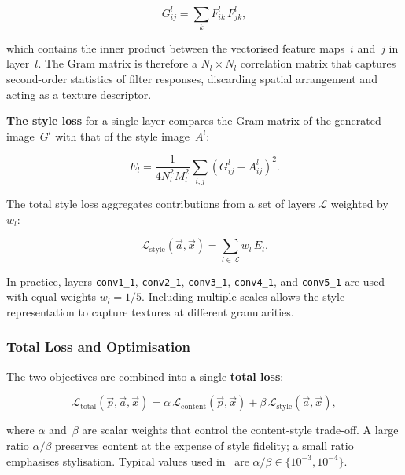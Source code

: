 \documentclass{article}
\begin{document}
\begin{equation}
    G^l_{ij} = \sum_{k} F^l_{ik}\, F^l_{jk},
    \label{eq:gram}
\end{equation}

\noindent which contains the inner product between the vectorised feature
maps~$i$ and~$j$ in layer~$l$. The Gram matrix is therefore a
$N_l{\times}N_l$ correlation matrix that captures second-order statistics of
filter responses, discarding spatial arrangement and acting as a texture
descriptor.

\textbf{The style loss} for a single layer compares the Gram matrix of the
generated image~$G^l$ with that of the style image~$A^l$:

\begin{equation}
    E_l = \frac{1}{4N_l^2 M_l^2}
          \sum_{i,j}\!\left(G^l_{ij} - A^l_{ij}\right)^2.
    \label{eq:layer_style_loss}
\end{equation}

The total style loss aggregates contributions from a set of layers $\mathcal{L}$
weighted by $w_l$:

\begin{equation}
    \mathcal{L}_{\text{style}}(\vec{a},\vec{x})
    = \sum_{l \in \mathcal{L}} w_l\, E_l.
    \label{eq:style_loss}
\end{equation}

In practice, layers \texttt{conv1\_1}, \texttt{conv2\_1}, \texttt{conv3\_1},
\texttt{conv4\_1}, and \texttt{conv5\_1} are used with equal weights
$w_l = 1/5$. Including multiple scales allows the style representation to
capture textures at different granularities.

\subsubsection{Total Loss and Optimisation}

The two objectives are combined into a single \textbf{total loss}:

\begin{equation}
    \mathcal{L}_{\text{total}}(\vec{p},\vec{a},\vec{x})
    = \alpha\,\mathcal{L}_{\text{content}}(\vec{p},\vec{x})
    + \beta\,\mathcal{L}_{\text{style}}(\vec{a},\vec{x}),
    \label{eq:total_loss}
\end{equation}

\noindent where $\alpha$ and~$\beta$ are scalar weights that control the
content-style trade-off.  A large ratio $\alpha/\beta$ preserves content at the
expense of style fidelity; a small ratio emphasises stylisation. Typical values
used in~\cite{gatys2015neural} are $\alpha/\beta \in \{10^{-3}, 10^{-4}\}$.
\end{document}
